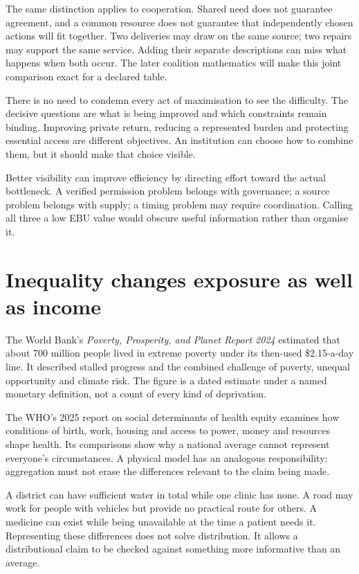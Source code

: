 The same distinction applies to cooperation. Shared need does not guarantee agreement, and a common resource does not guarantee that independently chosen actions will fit together. Two deliveries may draw on the same source; two repairs may support the same service. Adding their separate descriptions can miss what happens when both occur. The later coalition mathematics will make this joint comparison exact for a declared table.

There is no need to condemn every act of maximisation to see the difficulty. The decisive questions are what is being improved and which constraints remain binding. Improving private return, reducing a represented burden and protecting essential access are different objectives. An institution can choose how to combine them, but it should make that choice visible.

Better visibility can improve efficiency by directing effort toward the actual bottleneck. A verified permission problem belongs with governance; a source problem belongs with supply; a timing problem may require coordination. Calling all three a low EBU value would obscure useful information rather than organise it.

\section{Inequality changes exposure as well as income}
The World Bank's \emph{Poverty, Prosperity, and Planet Report 2024} estimated that about 700 million people lived in extreme poverty under its then-used \$2.15-a-day line. It described stalled progress and the combined challenge of poverty, unequal opportunity and climate risk. The figure is a dated estimate under a named monetary definition, not a count of every kind of deprivation.\cite{intro-worldbank}

The WHO's 2025 report on social determinants of health equity examines how conditions of birth, work, housing and access to power, money and resources shape health. Its comparisons show why a national average cannot represent everyone's circumstances.\cite{intro-health} A physical model has an analogous responsibility: aggregation must not erase the differences relevant to the claim being made.

A district can have sufficient water in total while one clinic has none. A road may work for people with vehicles but provide no practical route for others. A medicine can exist while being unavailable at the time a patient needs it. Representing these differences does not solve distribution. It allows a distributional claim to be checked against something more informative than an average.


